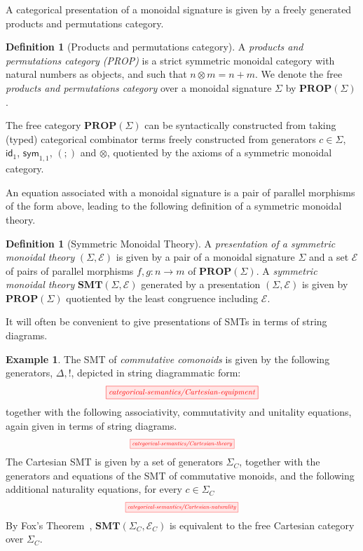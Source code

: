 \documentclass[sigconf, 9pt, nonacm]{acmart}
\theoremstyle{definition}
\newtheorem{definition}[thm]{Definition}
\newtheorem{example}[thm]{Example}
\newcommand\sym{\textsf{sym}}
\begin{document}
A categorical presentation of a monoidal signature is given by a freely generated products and permutations category.  
\begin{definition}[Products and permutations category]
A \textit{products and permutations category (PROP)} is a strict symmetric monoidal category with natural numbers as objects,  and such that $n \otimes m = n+m$.
We denote the free \textit{products and permutations category} over a monoidal signature $\Sigma$ by $\textbf{PROP}(\Sigma)$.  
\end{definition}
The free category $\textbf{PROP}(\Sigma)$ can be syntactically constructed from taking (typed) categorical combinator terms freely constructed from generators $c \in \Sigma$, $\textsf{id}_1$, $\sym_{1,1}$, $(;\!)$ and $\otimes$, quotiented by the axioms of a symmetric monoidal category.

An equation associated with a monoidal signature is a pair of parallel morphisms of the form above, leading to the following definition of a symmetric monoidal theory. 
\begin{definition}[Symmetric Monoidal Theory]
A \textit{presentation of a symmetric monoidal theory} $(\Sigma, \mathcal{E})$ is given by a pair of a monoidal signature $\Sigma$ and a set $\mathcal{E}$ of pairs of parallel morphisms $f,g: n \to m$ of $\textbf{PROP}(\Sigma)$.
A \textit{symmetric monoidal theory} $\textbf{SMT}(\Sigma,\mathcal{E})$ generated by a presentation $(\Sigma, \mathcal{E})$ is given by $\textbf{PROP}(\Sigma)$ quotiented by the least congruence including $\mathcal{E}$.
\end{definition}

It will often be convenient to give presentations of SMTs in terms of string diagrams.
\begin{example}
\label{example:csmt}
The SMT of \textit{commutative comonoids} is given by the following generators, ${\Delta, !}$, depicted in string diagrammatic form:
\[
	\scalebox{0.8}{
  	 \tikzfig{categorical-semantics/Cartesian-equipment}
	}
\]
together with the following associativity, commutativity and unitality equations, again given in terms of string diagrams. 
\[
	\scalebox{0.6}{
	\tikzfig{categorical-semantics/Cartesian-theory}	
	}
\]
The Cartesian SMT is given by a set of generators $\Sigma_C$, together with the generators and equations of the SMT of commutative monoids, and the following additional naturality equations, for every $c \in \Sigma_C$
\[
	\scalebox{0.6}{
	\tikzfig{categorical-semantics/Cartesian-naturality}
	}
\]
By Fox's Theorem~\cite{fox},  $\textbf{SMT}(\Sigma_C, \mathcal{E}_C)$ is equivalent to the free Cartesian category over $\Sigma_C$. 
\end{example}
\end{document}
